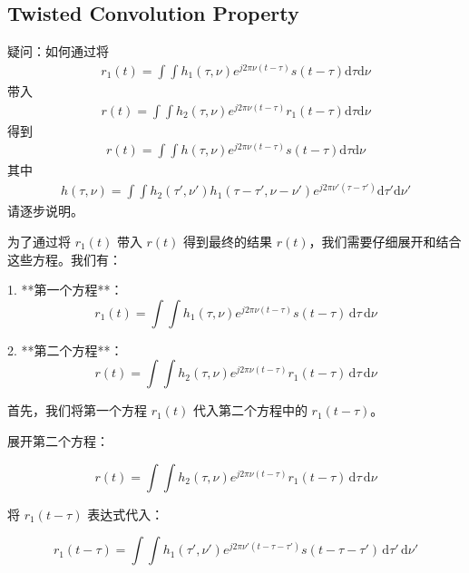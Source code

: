 \documentclass[12pt,a4paper]{article}%
\begin{document}
	\subsection{Twisted Convolution Property}
	疑问：如何通过将 
	\begin{equation}
		\begin{aligned}r_1(t)=\int\int h_1(\tau,\nu)e^{j2\pi\nu(t-\tau)}s(t-\tau)\mathrm d\tau\mathrm d\nu\end{aligned}
	\end{equation}
	带入
	\begin{equation}
		\begin{aligned}r(t)=\int\int h_2(\tau,\nu)e^{j2\pi\nu(t-\tau)}r_1(t-\tau)\mathrm d\tau\mathrm d\nu
		\end{aligned}
	\end{equation}
	得到
	\begin{equation}
		\begin{aligned}
			r(t)=\int\int h(\tau,\nu)e^{j2\pi\nu(t-\tau)}s(t-\tau)\mathrm{d}\tau\mathrm{d}\nu
		\end{aligned}
	\end{equation}
	其中
	\begin{equation}
		\begin{aligned}h(\tau,\nu)=\int\int h_2(\tau',\nu')h_1(\tau-\tau',\nu-\nu')e^{j2\pi\nu'(\tau-\tau')}\mathrm d\tau'\mathrm d\nu'\end{aligned}
	\end{equation}
请逐步说明。

	为了通过将 \( r_1(t) \) 带入 \( r(t) \) 得到最终的结果 \( r(t) \)，我们需要仔细展开和结合这些方程。我们有：

1. **第一个方程**：
   \[
   r_1(t) = \int\int h_1(\tau,\nu) e^{j2\pi\nu(t-\tau)} s(t-\tau) \, \mathrm{d}\tau \, \mathrm{d}\nu
   \]

2. **第二个方程**：
   \[
   r(t) = \int\int h_2(\tau,\nu) e^{j2\pi\nu(t-\tau)} r_1(t-\tau) \, \mathrm{d}\tau \, \mathrm{d}\nu
   \]

首先，我们将第一个方程 \( r_1(t) \) 代入第二个方程中的 \( r_1(t-\tau) \)。

展开第二个方程：

\[
r(t) = \int\int h_2(\tau,\nu) e^{j2\pi\nu(t-\tau)} r_1(t-\tau) \, \mathrm{d}\tau \, \mathrm{d}\nu
\]

将 \( r_1(t-\tau) \) 表达式代入：

\[
r_1(t-\tau) = \int\int h_1(\tau',\nu') e^{j2\pi\nu'(t-\tau-\tau')} s(t-\tau-\tau') \, \mathrm{d}\tau' \, \mathrm{d}\nu'
\]
\end{document}
